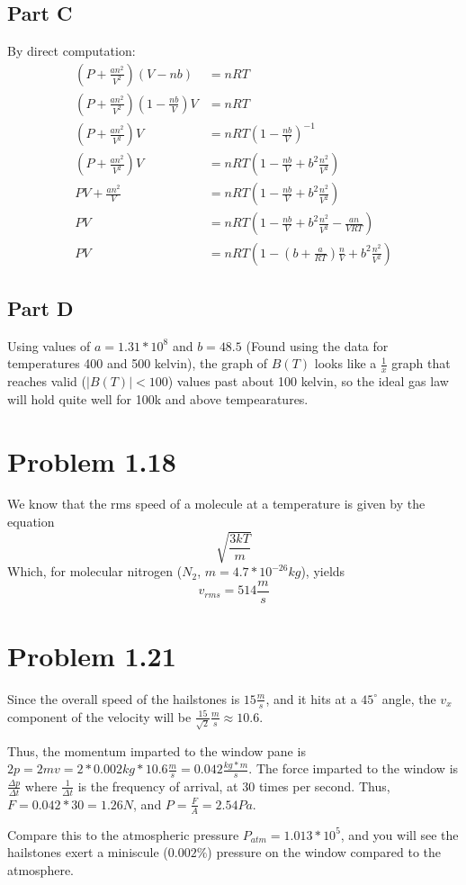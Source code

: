 \documentclass[paper=a4, fontsize=11pt]{scrartcl} %
\numberwithin{equation}{section} %
\numberwithin{figure}{section} %
\numberwithin{table}{section} %
\begin{document}
\subsection*{Part C}
By direct computation:
\[
\begin{aligned}
(P+\frac{an^2}{V^2})(V-nb) &= nRT\\
(P+\frac{an^2}{V^2})(1-\frac{nb}{V})V &= nRT\\
(P+\frac{an^2}{V^2})V &= nRT\left(1-\frac{nb}{V}\right)^{-1}\\
(P+\frac{an^2}{V^2})V &= nRT\left(1-\frac{nb}{V} + b^2\frac{n^2}{V^2}\right)\\
PV + \frac{an^2}{V}   &= nRT\left(1-\frac{nb}{V} + b^2\frac{n^2}{V^2}\right)\\
PV                    &= nRT\left(1-\frac{nb}{V} + b^2\frac{n^2}{V^2} - \frac{an}{VRT}\right)\\
PV &= nRT\left(1-(b+\frac{a}{RT})\frac{n}{V} + b^2\frac{n^2}{V^2}\right)
\end{aligned}
\]

\subsection*{Part D}
Using values of $a=1.31*10^8$ and $b=48.5$ (Found using the data for temperatures 400 and 500 kelvin),
the graph of $B(T)$ looks like a $\frac{1}{x}$ graph that reaches valid ($|B(T)| < 100$) values past about
100 kelvin, so the ideal gas law will hold quite well for 100k and above tempearatures.

\section*{Problem 1.18}
We know that the rms speed of a molecule at a temperature is given by the equation
\[
\sqrt{\frac{3kT}{m}}
\]
Which, for molecular nitrogen ($N_2$, $m=4.7*10^{-26}kg$), yields
\[
v_{rms} = 514\frac{m}{s}
\]


\section*{Problem 1.21}
Since the overall speed of the hailstones is $15\frac{m}{s}$, and it hits at a $45^{\circ}$ angle,
the $v_x$ component of the velocity will be $\frac{15}{\sqrt{2}}\frac{m}{s}\approx 10.6$.

Thus, the momentum imparted to the window pane is $2p=2mv=2*0.002kg*10.6\frac{m}{s} = 0.042 \frac{kg*m}{s}$.
The force imparted to the window is $\frac{\Delta p}{\Delta t}$ where $\frac{1}{\Delta t}$ is the
frequency of arrival, at 30 times per second. Thus, $F = 0.042*30 = 1.26 N$, and
$P = \frac{F}{A} = 2.54 Pa$.

Compare this to the atmospheric pressure $P_{atm} = 1.013*10^5$, and you will see the hailstones
exert a miniscule ($0.002\%$) pressure on the window compared to the atmosphere.



\end{document}

